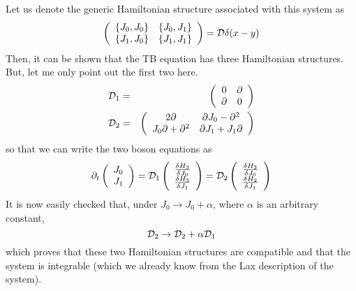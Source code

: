 \documentclass[a4paper,11pt]{article}
\begin{document}
Let us denote the generic Hamiltonian structure associated with this
system as 
\begin{equation}
\left(\begin{array}{cc}
\{J_{0},J_{0}\} & \{J_{0},J_{1}\}\\
\{J_{1},J_{0}\} & \{J_{1},J_{1}\}
\end{array}\right) = {\cal D} \delta (x-y)
\end{equation}
Then, it can be shown that the TB equation has three Hamiltonian
structures. But, let me only point out the first two here.
\begin{eqnarray}
{\cal D}_{1} & = & \left(\begin{array}{cc}
0 & \partial\\
\partial & 0
\end{array}\right)\nonumber\\
{\cal D}_{2} & = & \left(\begin{array}{cc}
2\partial & \partial J_{0} - \partial^{2}\\
J_{0}\partial + \partial^{2} & \partial J_{1} + J_{1} \partial
\end{array}\right)
\end{eqnarray}
so that we can write the two boson equations as 
\begin{equation}
\partial_{t} \left(\begin{array}{c}
J_{0}\\
J_{1}
\end{array}\right) = {\cal D}_{1} \left(\begin{array}{c}
{\delta H_{3}\over \delta J_{0}}\\
{\delta H_{3}\over \delta J_{1}}
\end{array}\right) = {\cal D}_{2} \left(\begin{array}{c}
{\delta H_{2}\over \delta J_{0}}\\
{\delta H_{2}\over \delta J_{1}}
\end{array}\right)
\end{equation}
It is now easily checked that, under $J_{0}\rightarrow J_{0} +
\alpha$, where $\alpha$ is an arbitrary constant, 
\begin{equation}
{\cal D}_{2} \rightarrow {\cal D}_{2} + \alpha {\cal D}_{1}
\end{equation}
which proves that these two Hamiltonian structures are compatible and
that the system is integrable (which we already know from the Lax
description of the system).
\end{document}
